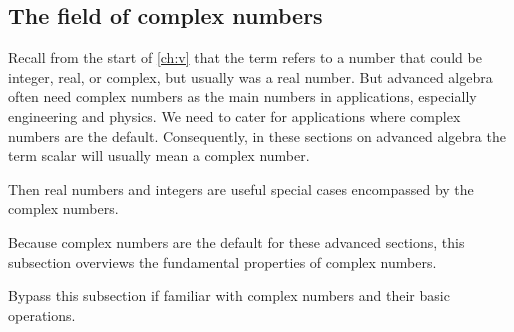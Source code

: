 \begin{draft}
%
%
%
%
%
%
%
%

\subsection{The field of complex numbers}
\label{sec:fcn}

Recall from the start of \cref{ch:v} that the term  refers to a number that could be integer, real, or complex, but usually was a real number.
But advanced algebra often need complex numbers as the main numbers in applications, especially engineering and physics. 
We need to cater for applications where complex numbers are the default.
Consequently, in these sections on advanced algebra the term scalar will usually mean a complex number.

Then real numbers and integers are useful special cases encompassed by the complex numbers.

Because complex numbers are the default for these advanced sections, this subsection overviews the fundamental properties of complex numbers.
\begin{aside}
Bypass this subsection if familiar with complex numbers and their basic operations.
\end{aside}


\end{draft}
